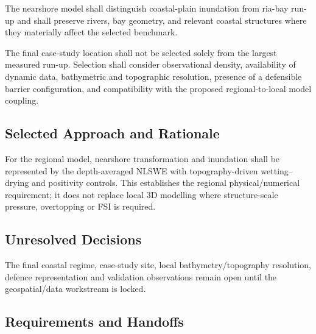 
The nearshore model shall distinguish coastal-plain inundation from ria-bay run-up and shall preserve rivers, bay geometry, and relevant coastal structures where they materially affect the selected benchmark. 

The final case-study location shall not be selected solely from the largest measured run-up. Selection shall consider observational density, availability of dynamic data, bathymetric and topographic resolution, presence of a defensible barrier configuration, and compatibility with the proposed regional-to-local model coupling.

\subsection{Selected Approach and Rationale}
\label{sec:res-phy-nrs-selected-approach}


For the regional model, nearshore transformation and inundation shall be
represented by the depth-averaged NLSWE with topography-driven
wetting--drying and positivity controls. This establishes the regional
physical/numerical requirement; it does not replace local 3D modelling
where structure-scale pressure, overtopping or FSI is required.

\subsection{Unresolved Decisions}
\label{sec:res-phy-nrs-unresolved-decisions}


The final coastal regime, case-study site, local bathymetry/topography
resolution, defence representation and validation observations remain
open until the geospatial/data workstream is locked.

\subsection{Requirements and Handoffs}
\label{sec:res-phy-nrs-requirements}


